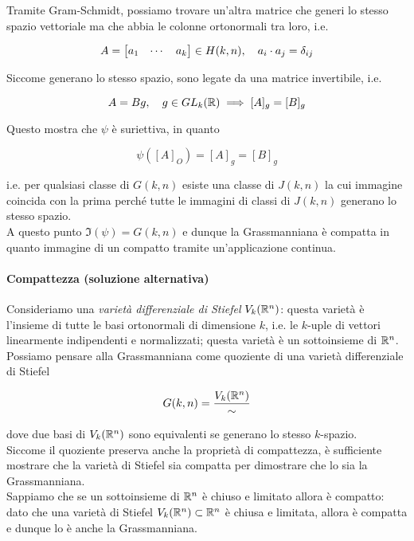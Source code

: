 {Tramite Gram-Schmidt, possiamo trovare un'altra matrice che generi lo stesso spazio vettoriale ma che abbia le colonne ortonormali tra loro, i.e.

\begin{equation}
	A = \bmqty{ a_{1} & \cdots & a_{k} } \in H(k,n) \qcomma a_{i} \cdot a_{j} = \delta_{ij}
\end{equation}

Siccome generano lo stesso spazio, sono legate da una matrice invertibile, i.e.

\begin{equation}
	A = B g \qcomma g \in GL_{k}(\R) %
	\implies %
	[A]_{g} = [B]_{g}
\end{equation}

Questo mostra che $ \psi $ è suriettiva, in quanto

\begin{equation}
	\psi([A]_{O}) = [A]_{g} = [B]_{g}
\end{equation}

i.e. per qualsiasi classe di $ G(k,n) $ esiste una classe di $ J(k,n) $ la cui immagine coincida con la prima perché tutte le immagini di classi di $ J(k,n) $ generano lo stesso spazio. \\
A questo punto $ \Im(\psi) = G(k,n) $ e dunque la Grassmanniana è compatta in quanto immagine di un compatto tramite un'applicazione continua.

\paragraph{Compattezza (soluzione alternativa)}

Consideriamo una \textit{varietà differenziale di Stiefel} $ V_{k}(\mathbb{R}^{n}) $: questa varietà è l'insieme di tutte le basi ortonormali di dimensione $ k $, i.e. le $ k $-uple di vettori linearmente indipendenti e normalizzati; questa varietà è un sottoinsieme di $ \mathbb{R}^{n} $. Possiamo pensare alla Grassmanniana come quoziente di una varietà differenziale di Stiefel

\begin{equation}
	G(k,n) = \dfrac{V_{k}(\mathbb{R}^{n})}{\sim}
\end{equation}

dove due basi di $ V_{k}(\mathbb{R}^{n}) $ sono equivalenti se generano lo stesso $ k $-spazio. \\
Siccome il quoziente preserva anche la proprietà di compattezza, è sufficiente mostrare che la varietà di Stiefel sia compatta per dimostrare che lo sia la Grassmanniana. \\
Sappiamo che se un sottoinsieme di $ \mathbb{R}^{n} $ è chiuso e limitato allora è compatto: dato che una varietà di Stiefel $ V_{k}(\mathbb{R}^{n}) \subset \mathbb{R}^{n} $ è chiusa e limitata, allora è compatta e dunque lo è anche la Grassmanniana.
}


